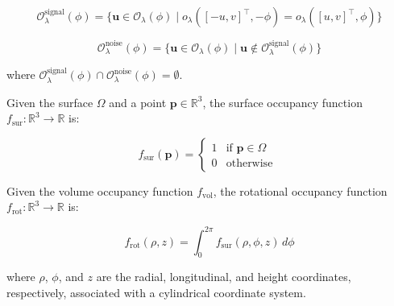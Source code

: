 \begin{definition}

    \begin{equation}
        \mathcal{O}^{\mathrm{signal}}_\lambda(\phi) = \{ \mathbf{u}\in \mathcal{O}_\lambda(\phi) \; | \; o_\lambda([-u,v]^\top,-\phi)=o_\lambda([u,v]^\top,\phi) \}
    \end{equation}

    \begin{equation}
        \mathcal{O}^{\mathrm{noise}}_\lambda(\phi) = \{ \mathbf{u}\in \mathcal{O}_\lambda(\phi) \; | \; \mathbf{u} \notin \mathcal{O}^{\mathrm{signal}}_\lambda(\phi) \}
    \end{equation}

    where $\mathcal{O}^{\mathrm{signal}}_\lambda(\phi) \cap \mathcal{O}^{\mathrm{noise}}_\lambda(\phi) = \emptyset$.
\end{definition}











\begin{definition}
    Given the surface $\Omega$ and a point $\mathbf{p}\in\mathbb{R}^3$, the surface occupancy function $f_\mathrm{sur}:\mathbb{R}^3 \rightarrow \mathbb{R}$ is:
    
    \begin{equation}
        f_\mathrm{sur}(\mathbf{p}) = \begin{cases}
    1 & \text{if } \mathbf{p} \in \Omega \\
    0   & \text{otherwise }
  \end{cases}
    \end{equation}
\end{definition}

\begin{definition}
    \label{def:f_rot}
    Given the volume occupancy function $f_\mathrm{vol}$, the rotational occupancy function $f_\mathrm{rot}:\mathbb{R}^3 \rightarrow \mathbb{R}$ is:

    \begin{equation}
        f_\mathrm{rot}(\rho, z) = \int_0^{2\pi} f_\mathrm{sur}(\rho,\phi,z)\,d\phi
    \end{equation}

    where $\rho$, $\phi$, and $z$ are the radial, longitudinal, and height coordinates, respectively, associated with a cylindrical coordinate system.
\end{definition}

